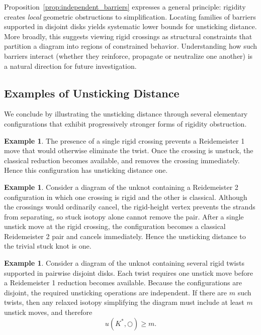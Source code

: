 \documentclass[11pt,a4paper]{article}
\theoremstyle{plain}
\theoremstyle{definition}
\newtheorem{example}[theorem]{Example}
\begin{document}
Proposition~\ref{prop:independent_barriers} expresses a general principle: rigidity creates \emph{local} geometric obstructions to simplification. Locating families of barriers supported in disjoint disks yields systematic lower bounds for unsticking distance. More broadly, this suggests viewing rigid crossings as structural constraints that partition a diagram into regions of constrained behavior. Understanding how such barriers interact (whether they reinforce, propagate or
neutralize one another) is a natural direction for future investigation.









\subsection{Examples of Unsticking Distance}

We conclude by illustrating the unsticking distance through several elementary configurations that exhibit progressively stronger forms of rigidity obstruction.


\begin{example}
The presence of a single rigid crossing prevents a Reidemeister 1 move that would otherwise eliminate the twist. Once the crossing is unstuck, the classical reduction becomes available, and removes the crossing immediately. Hence this configuration has unsticking distance one.
\end{example}

\begin{example}
Consider a diagram of the unknot containing a Reidemeister 2 configuration in which one crossing is rigid and the other is classical. Although the crossings would ordinarily cancel, the rigid-height vertex prevents the strands from separating, so stuck isotopy alone cannot remove the pair. After a single unstick move at the rigid crossing, the configuration becomes a classical Reidemeister 2 pair and cancels immediately. Hence the unsticking distance to the trivial stuck knot is one.
\end{example}

\begin{example}
Consider a diagram of the unknot containing several rigid twists supported in pairwise disjoint disks. Each twist requires one unstick move before a Reidemeister 1 reduction becomes available. Because the configurations are disjoint, the required unsticking operations are independent. If there are $m$ such twists, then any relaxed isotopy simplifying the diagram must include at least $m$ unstick moves, and therefore
\[
u(K^*,\bigcirc) \ge m.
\]
\end{example}
\end{document}
